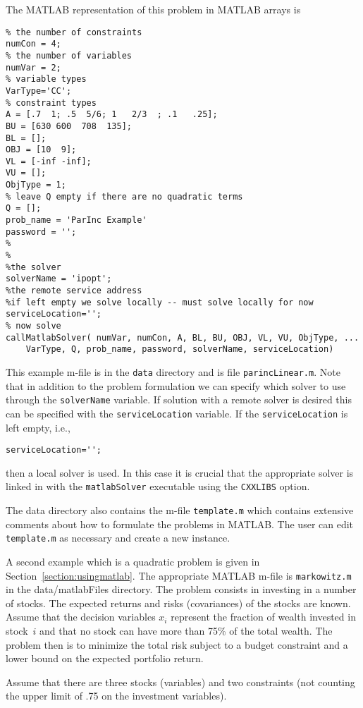 The MATLAB representation of this problem in MATLAB arrays is
\begin{verbatim}
% the number of constraints
numCon = 4;
% the number of variables
numVar = 2;
% variable types
VarType='CC';
% constraint types
A = [.7  1; .5  5/6; 1   2/3  ; .1   .25];
BU = [630 600  708  135];
BL = [];
OBJ = [10  9];
VL = [-inf -inf];
VU = [];
ObjType = 1;
% leave Q empty if there are no quadratic terms
Q = [];
prob_name = 'ParInc Example'
password = '';
%
%
%the solver
solverName = 'ipopt';
%the remote service address
%if left empty we solve locally -- must solve locally for now
serviceLocation='';
% now solve
callMatlabSolver( numVar, numCon, A, BL, BU, OBJ, VL, VU, ObjType, ...
    VarType, Q, prob_name, password, solverName, serviceLocation)
\end{verbatim}
This example m-file is in the {\tt data} directory and is file {\tt parincLinear.m}. Note that in addition to the problem formulation
we can specify which solver to use through the {\tt solverName} variable.  If solution with a remote solver is desired
this can be specified with the {\tt serviceLocation} variable.  If the {\tt serviceLocation} is left empty, i.e.,
\begin{verbatim}
serviceLocation='';
\end{verbatim}
then a local solver is used. In this case  it is crucial that the appropriate solver is linked in with the {\tt matlabSolver}
executable using the {\tt CXXLIBS} option.


The data directory  also contains the m-file  {\tt template.m} which contains extensive comments about how to formulate
the problems in MATLAB.   The user can edit {\tt template.m} as necessary and create a new instance.




 A second example which is a quadratic problem is given in Section~\ref{section:usingmatlab}.
The appropriate MATLAB m-file is {\tt markowitz.m} in the {data/matlabFiles} directory.
The problem consists in investing  in a number of stocks. The expected returns and risks
(covariances) of the stocks are known. Assume that the decision variables $x_i$
represent the fraction of wealth invested in stock~$i$ and that no stock can have
more than 75\% of the total wealth. The problem then is to minimize the total risk
subject to a budget constraint and a lower bound on the expected portfolio return.

Assume that there are three stocks (variables) and two constraints (not counting the upper limit  %
of .75 on the investment variables).


